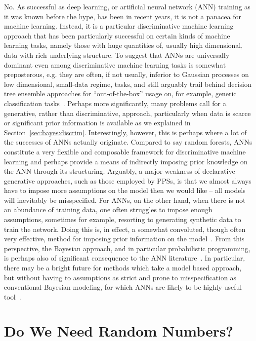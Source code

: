 No.  As successful as deep learning, or artificial neural network (ANN) training as it was known before the hype,
has been in recent years, it is not a panacea for machine learning.  Instead, it is a particular discriminative
machine learning approach that has been particularly successful on certain kinds of machine learning tasks,
namely those with huge quantities of, usually high dimensional, data with rich underlying structure.   
To suggest that ANNs are universally dominant even among discriminative machine learning tasks is
somewhat preposterous, e.g. they are often, if not usually, inferior to Gaussian processes on low dimensional,
small-data regime, tasks, and still arguably trail behind decision tree ensemble approaches for ``out-of-the-box''
usage on, for example, generic classification tasks~\citep{rainforth2015canonical}.   Perhaps more significantly,
many problems call for a generative, rather than discriminative, approach,
particularly when data is scarce or significant prior information is available as we explained
in Section~\ref{sec:bayes:discrim}.  Interestingly, however, this is perhaps
where a lot of the successes of ANNs actually originate.  Compared to say random forests, ANNs constitute a very
flexible and composable framework for discriminative machine learning and perhaps provide a means of 
indirectly imposing prior knowledge on the ANN through its structuring.  Arguably, a major weakness of
declarative generative approaches, such as those employed by PPSs, is that we almost
always have to impose more assumptions on the model then we would like -- all models will inevitably be
misspecified.  For ANNs, on the other hand, when there is not an abundance of training data,
one often struggles to impose enough assumptions, sometimes
for example, resorting to generating synthetic data to train the network.  Doing this is, in effect, a somewhat convoluted,
though often very effective, method for imposing prior information on the model~\citep{le2017using}.  From this
perspective, the Bayesian approach, and in particular probabilistic programming, is perhaps also of significant
consequence to the ANN literature~\citep{gal2016uncertainty}.
In particular, there may be a bright future for methods which
take a model based approach, but without having to assumptions as strict and prone to misspecification
as conventional Bayesian modeling, for which ANNs are likely to be highly useful tool~\citep{siddharth2017learning}.

\section{Do We Need Random Numbers?}

